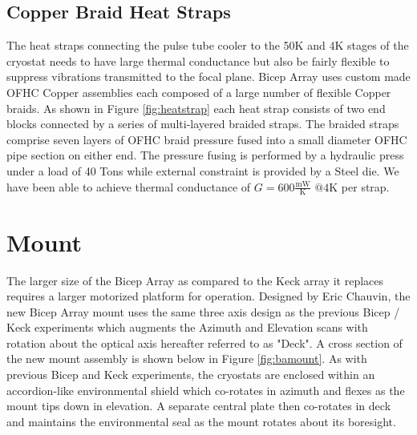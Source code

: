 \documentclass[]{spie}  %
\begin{document}
\subsection{Copper Braid Heat Straps}

The heat straps connecting the pulse tube cooler to the 50K and 4K stages of
the cryostat needs to have large thermal conductance but also be fairly
flexible to suppress vibrations transmitted to the focal plane. Bicep Array
uses custom made OFHC Copper assemblies each composed of a large number of
flexible Copper braids. As shown in Figure \ref{fig:heatstrap} each heat strap
consists of two end blocks connected by a series of multi-layered braided
straps. The braided straps comprise seven layers of OFHC braid
pressure fused into a small diameter OFHC pipe section on either end. The
pressure fusing is performed by a hydraulic press under a load of 40 Tons
while external constraint is provided by a Steel die. We have been able to
achieve thermal conductance of $G=600 \frac{\text{mW}}{\text{K}}
\text{  @}4\text{K}$ per strap. 




\section{Mount}

The larger size of the Bicep Array as compared to the Keck array it replaces
requires a larger motorized platform for operation. Designed by Eric Chauvin,
the new Bicep Array mount uses the same three axis design as the previous
Bicep / Keck experiments which augments the Azimuth and Elevation scans with
rotation about the optical axis hereafter referred to as "Deck". A cross section of the new mount assembly is shown below in Figure
\ref{fig:bamount}. As with previous Bicep and Keck experiments, the cryostats
are enclosed within an accordion-like environmental shield which co-rotates in
azimuth and flexes as the mount tips down in elevation. A separate central
plate then co-rotates in deck and maintains the environmental seal as the mount
rotates about its boresight. 
\end{document}
